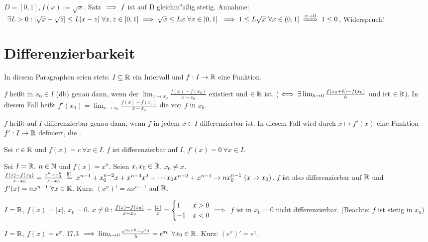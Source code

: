 \documentclass[a4paper,twoside,DIV15,BCOR12mm]{scrbook}
\begin{document}
\begin{beispiel}
$D=[0,1], f(x):=\sqrt{x}$. Satz $\implies f$ ist auf D gleichm"aßig stetig. Annahme: $\ \exists L>0: |\sqrt{x}-\sqrt{z}|\le L|x-z| \ \forall x,z \in [0,1] \folgt \sqrt{x} \le Lx\ \forall x \in [0,1]\ \folgt 1\le L\sqrt{x}\ \forall x \in (0,1] \folgtwegen{x\to0}1\le0$, Widerspruch!
\end{beispiel}

\chapter{Differenzierbarkeit}

In diesem Paragraphen seien stets: $I\subseteq\mathbb{R}$ ein Intervall und $f:I\to\mathbb{R}$ eine Funktion.

\begin{definition}
\begin{liste}
\item $f$ heißt in $x_0\in I$  (db) genau dann, wenn der $\lim_{x\to x_0}\frac{f(x) - f(x_0) }{x-x_0}$ existiert und $\in\mathbb{R}$ ist. ($\iff \exists \lim_{h\to0}\frac{f(x_0+h) - f(x_0)}{h}$ und ist $\in\mathbb{R}$). In diesem Fall heißt $f'(x_0) = \lim_{x\to x_0}\frac{f(x) - f(x_0) }{x-x_0}$ die  von $f$ in $x_0$.

\item $f$ heißt auf $I$ differenzierbar genau dann, wenn $f$ in jedem $x\in I$ differenzierbar ist. In diesem Fall wird durch $x\mapsto f'(x)$ eine Funktion $f': I\to\mathbb{R}$ definiert, die .
\end{liste}
\end{definition}

\begin{beispiele}
\item Sei $c\in\mathbb{R}$ und $f(x)=c\ \forall x\in I$. $f$ ist differenzierbar auf $I$, $f'(x)=0 \ \forall x \in I$.
\item Sei $I=\mathbb{R} $, $n\in\mathbb{N}$ und $f(x)=x^n$. Seien $x, x_0 \in\mathbb{R}$, $x_0 \ne x$. $\frac{f(x)-f(x_0)}{x-x_0} = \frac{x^n-x_0^n}{x-x_0} \gleichnach{§1} x^{n-1}+x_0^{n-2}x+x^{n-3}x^2+\cdots x_0x^{n-2} + x^{n-1} \to nx_0^{n-1}\ (x\to x_0)$. $f$ ist also differenzierbar auf $\mathbb{R}$ und $f'(x) = nx^{n-1} \ \forall x\in\mathbb{R}$. Kurz: $(x^n)' = nx^{n-1}$ auf $\mathbb{R}$.
\item $I=\mathbb{R}$, $f(x)=|x|$, $x_0 = 0$. $x\ne0: \frac{f(x)-f(x_0)}{x-x_0} = \frac{|x|}{x} = \begin{cases}1&x>0\\-1&x<0\end{cases} \implies$ $f$ ist in $x_0=0$ nicht differenzierbar. (Beachte: $f$ ist stetig in $x_0$)
\item $I=\mathbb{R}$, $f(x)=e^x$. 17.3 $\implies \lim_{h\to0}\frac{e^{x_0+h} - e^{x_0}}{h} = e^{x_0} \ \forall x_0 \in\mathbb{R}$. Kurz: $(e^x)' = e^x$.
\end{beispiele}
\end{document}
